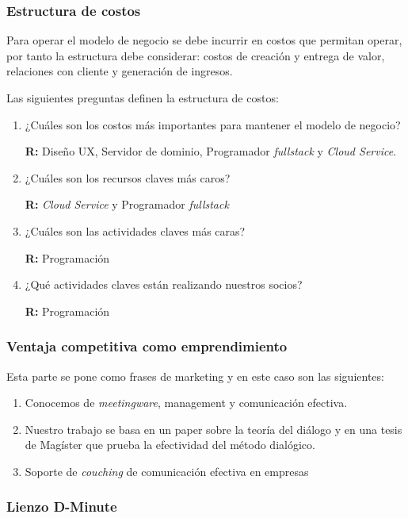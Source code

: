 \subsubsection{Estructura de costos}

Para operar el modelo de negocio se debe incurrir en costos que permitan operar, por tanto la estructura debe considerar: costos de creación y entrega de valor, relaciones con cliente y generación de ingresos. 

Las siguientes preguntas definen la estructura de costos:

\begin{enumerate}[1.]
	\item ¿Cuáles son los costos más importantes para mantener el modelo de negocio? 
	
	\textbf{R:} Diseño UX, Servidor de dominio, Programador \textit{fullstack} y \textit{Cloud Service}.
	\item ¿Cuáles son los recursos claves más caros? 
	
	\textbf{R:} \textit{Cloud Service} y Programador \textit{fullstack}
	\item ¿Cuáles son las actividades claves más caras? 

	\textbf{R:} Programación 

	\item ¿Qué actividades claves están realizando nuestros socios? 
	
	\textbf{R:} Programación
\end{enumerate}

\subsubsection{Ventaja competitiva como emprendimiento}

Esta parte se pone como frases de marketing y en este caso son las siguientes: 

\begin{enumerate}[1.]
	\item Conocemos de \textit{meetingware}, management y comunicación efectiva.
	\item Nuestro trabajo se basa en un paper sobre la teoría del diálogo y en una tesis de Magíster que prueba la efectividad del método dialógico.
	\item Soporte de \textit{couching} de comunicación efectiva en empresas
\end{enumerate}

\subsubsection{Lienzo D-Minute}

